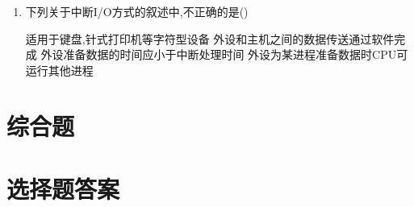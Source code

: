 \documentclass[12pt, a4paper, oneside, UTF8]{ctexbook}
\begin{document}
\begin{enumerate}
    \item \bl 下列关于中断I/O方式的叙述中,不正确的是() 
    \begin{choices}[1]
        \task 适用于键盘,针式打印机等字符型设备 
        \task 外设和主机之间的数据传送通过软件完成
        \task 外设准备数据的时间应小于中断处理时间 
        \task 外设为某进程准备数据时CPU可运行其他进程
    \end{choices}
\end{enumerate}

\section{综合题}

\section{选择题答案}
\end{document}
